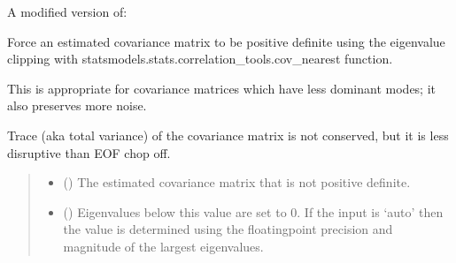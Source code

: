 \documentclass[letterpaper,10pt,english]{sphinxmanual}
\begin{document}
\begin{fulllineitems}
\label{\detokenize{misc:glomar_gridding.covariance_tools.simple_clipping}}
\pysigstartsignatures
\pysiglinewithargsret
{}
{\sphinxparamcomma {}\sphinxparamcomma {}}
{}
\pysigstopsignatures
\sphinxAtStartPar
A modified version of:

\sphinxAtStartPar
Force an estimated covariance matrix to be positive definite using the
eigenvalue clipping with statsmodels.stats.correlation\_tools.cov\_nearest
function.

\sphinxAtStartPar
This is appropriate for covariance matrices which have less dominant modes;
it also preserves more noise.

\sphinxAtStartPar
Trace (aka total variance) of the covariance matrix is not conserved,
but it is less disruptive than EOF chop off.
\begin{quote}\begin{description}
\begin{itemize}
\item {}
\sphinxAtStartPar
{} () \textendash{} The estimated covariance matrix that is not positive definite.

\item {}
\sphinxAtStartPar
{} () \textendash{} Eigenvalues below this value are set to 0. If the input is ‘auto’ then
the value is determined using the floating\sphinxhyphen{}point precision and magnitude
of the largest eigenvalues.

\end{itemize}

\sphinxAtStartPar
{}


\end{description}
\end{quote}
\end{fulllineitems}
\end{document}
